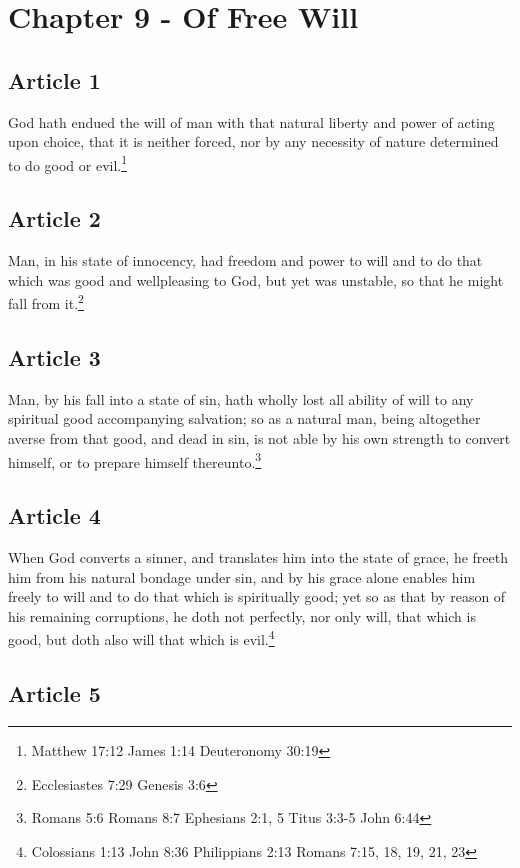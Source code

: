 \documentclass[12pt,letterpaper]{book}
\begin{document}
\chapter{Chapter 9 - Of Free Will}
\section{Article 1}

God hath endued the will of man with that natural liberty and power of acting upon choice, that it is neither forced, nor by any necessity of nature determined to do good or evil.\footnote{Matthew 17:12 James 1:14 Deuteronomy 30:19}

\section{Article 2}

Man, in his state of innocency, had freedom and power to will and to do that which was good and wellpleasing to God, but yet was unstable, so that he might fall from it.\footnote{Ecclesiastes 7:29 Genesis 3:6}

\section{Article 3}

Man, by his fall into a state of sin, hath wholly lost all ability of will to any spiritual good accompanying salvation; so as a natural man, being altogether averse from that good, and dead in sin, is not able by his own strength to convert himself, or to prepare himself thereunto.\footnote{Romans 5:6 Romans 8:7 Ephesians 2:1, 5 Titus 3:3-5 John 6:44}

\section{Article 4}

When God converts a sinner, and translates him into the state of grace, he freeth him from his natural bondage under sin, and by his grace alone enables him freely to will and to do that which is spiritually good; yet so as that by reason of his remaining corruptions, he doth not perfectly, nor only will, that which is good, but doth also will that which is evil.\footnote{Colossians 1:13 John 8:36 Philippians 2:13 Romans 7:15, 18, 19, 21, 23}

\section{Article 5}
\end{document}
